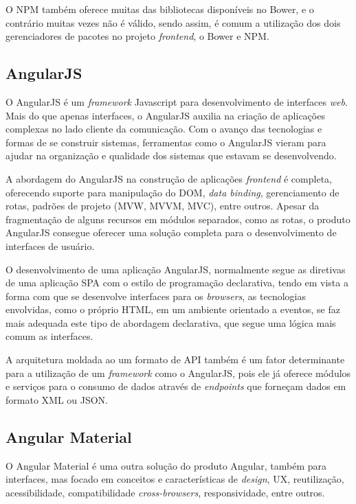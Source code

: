 O NPM também oferece muitas das bibliotecas disponíveis no Bower, e o contrário muitas vezes não é válido, sendo assim, é comum a utilização dos dois gerenciadores de pacotes no projeto \textit{frontend}, o Bower e NPM.

\subsection{AngularJS}
O AngularJS \cite{angular} é um \textit{framework} Javascript para desenvolvimento de interfaces \textit{web}. Mais do que apenas interfaces, o AngularJS auxilia na criação de aplicações complexas no lado cliente da comunicação. Com o avanço das tecnologias e formas de se construir sistemas, ferramentas como o AngularJS vieram para ajudar na organização e qualidade dos sistemas que estavam se desenvolvendo.

A abordagem do AngularJS na construção de aplicações \textit{frontend} é completa, oferecendo suporte para manipulação do DOM, \textit{data binding}, gerenciamento de rotas, padrões de projeto (MVW, MVVM, MVC), entre outros. Apesar da fragmentação de alguns recursos em módulos separados, como as rotas, o produto AngularJS consegue oferecer uma solução completa para o desenvolvimento de interfaces de usuário.

O desenvolvimento de uma aplicação AngularJS, normalmente segue as diretivas de uma aplicação SPA com o estilo de programação declarativa, tendo em vista a forma com que se desenvolve interfaces para os \textit{browsers}, as tecnologias envolvidas, como o próprio HTML, em um ambiente orientado a eventos, se faz mais adequada este tipo de abordagem declarativa, que segue uma lógica mais comum as interfaces.

A arquitetura moldada ao um formato de API também é um fator determinante para a utilização de um \textit{framework} como o AngularJS, pois ele já oferece módulos e serviços para o consumo de dados através de \textit{endpoints} que forneçam dados em formato XML ou JSON.

\subsection{Angular Material}
O Angular Material \cite{angular-material} é uma outra solução do produto Angular, também para interfaces, mas focado em conceitos e características de \textit{design}, UX, reutilização, acessibilidade, compatibilidade \textit{cross-browsers}, responsividade, entre outros. 

